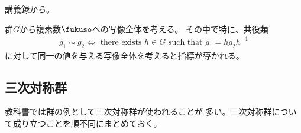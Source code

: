 	講義録\cite{bump.lecture}から。
	\begin{description}\setlength{\itemsep}{-1mm} %
		\item[指標の考え方] 群$G$から複素数$\fukuso$への写像全体を考える。
		その中で特に、共役類
		\begin{equation*}\begin{split} %
			g_1\sim g_2 \iff \text{ there exists }h\in G\text{ such that }
				g_1 = hg_2h^{-1}
		\end{split}\end{equation*} %
		に対して同一の値を与える写像全体を考えると指標が導かれる。
	\end{description} %
%
\subsection{三次対称群}\label{s2:三次対称群} %
	教科書\cite{bk:kikkawa.gun}では群の例として三次対称群が使われることが
	多い。三次対称群について成り立つことを順不同にまとめておく。

